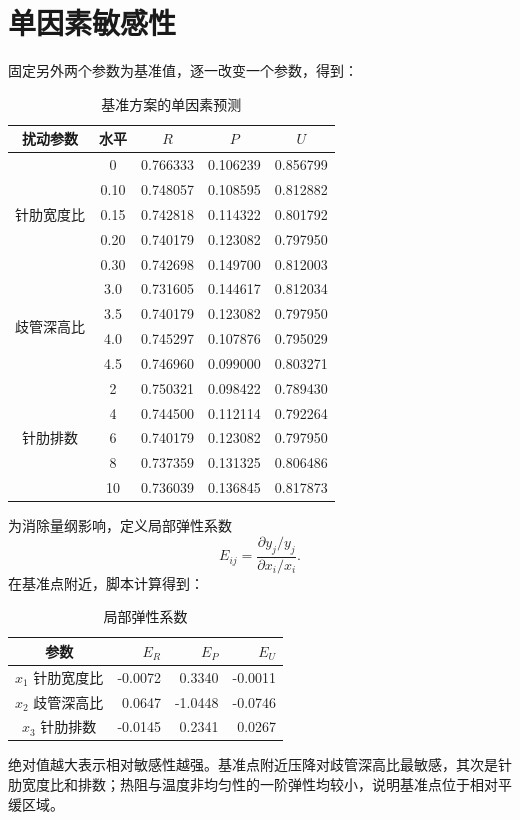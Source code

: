 \documentclass[UTF8,a4paper,12pt]{ctexart}
\begin{document}
\section{单因素敏感性}
固定另外两个参数为基准值，逐一改变一个参数，得到：
\begin{table}[h]\centering\caption{基准方案的单因素预测}
\begin{tabular}{c|c|ccc}\toprule
扰动参数 & 水平 & $R$ & $P$ & $U$\\\midrule
\multirow{5}{*}{针肋宽度比} & 0 & 0.766333&0.106239&0.856799\\
&0.10&0.748057&0.108595&0.812882\\
&0.15&0.742818&0.114322&0.801792\\
&0.20&0.740179&0.123082&0.797950\\
&0.30&0.742698&0.149700&0.812003\\\midrule
\multirow{4}{*}{歧管深高比} &3.0&0.731605&0.144617&0.812034\\
&3.5&0.740179&0.123082&0.797950\\
&4.0&0.745297&0.107876&0.795029\\
&4.5&0.746960&0.099000&0.803271\\\midrule
\multirow{5}{*}{针肋排数} &2&0.750321&0.098422&0.789430\\
&4&0.744500&0.112114&0.792264\\
&6&0.740179&0.123082&0.797950\\
&8&0.737359&0.131325&0.806486\\
&10&0.736039&0.136845&0.817873\\
\bottomrule\end{tabular}\end{table}

为消除量纲影响，定义局部弹性系数
\[
E_{ij}=\frac{\partial y_j/y_j}{\partial x_i/x_i}.
\]
在基准点附近，脚本计算得到：
\begin{table}[h]\centering\caption{局部弹性系数}
\begin{tabular}{c|rrr}\toprule
参数 & $E_R$ & $E_P$ & $E_U$\\\midrule
$x_1$ 针肋宽度比 & -0.0072&0.3340&-0.0011\\
$x_2$ 歧管深高比 & 0.0647&-1.0448&-0.0746\\
$x_3$ 针肋排数 & -0.0145&0.2341&0.0267\\
\bottomrule\end{tabular}\end{table}

绝对值越大表示相对敏感性越强。基准点附近压降对歧管深高比最敏感，其次是针肋宽度比和排数；热阻与温度非均匀性的一阶弹性均较小，说明基准点位于相对平缓区域。
\end{document}
